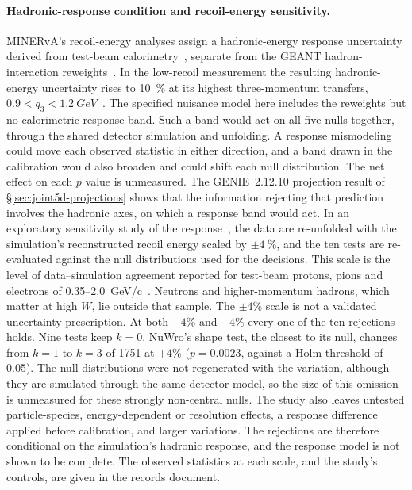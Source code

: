 \paragraph{Hadronic-response condition and recoil-energy sensitivity.} MINERvA's recoil-energy analyses assign a hadronic-energy response uncertainty derived from test-beam calorimetry~\cite{MINERvA:2015testbeam}, separate from the GEANT hadron-interaction reweights~\cite{MINERvA:2021owq,MINERvA:2022incl}. In the low-recoil measurement the resulting hadronic-energy uncertainty rises to \SI{10}{\percent} at its highest three-momentum transfers, $0.9<q_{3}<\SI{1.2}{GeV}$~\cite{MINERvA:2022incl}. The specified nuisance model here includes the reweights but no calorimetric response band. Such a band would act on all five nulls together, through the shared detector simulation and unfolding. A response mismodeling could move each observed statistic in either direction, and a band drawn in the calibration would also broaden and could shift each null distribution. The net effect on each $p$ value is unmeasured. The GENIE~2.12.10 projection result of \S\ref{sec:joint5d-projections} shows that the information rejecting that prediction involves the hadronic axes, on which a response band would act. In an exploratory sensitivity study of the response~\cite{JointTestRecoil2026}, the data are re-unfolded with the simulation's reconstructed recoil energy scaled by $\pm\SI{4}{\percent}$, and the ten tests are re-evaluated against the null distributions used for the decisions. This scale is the level of data--simulation agreement reported for test-beam protons, pions and electrons of 0.35--\SI{2.0}{GeV/c}~\cite{MINERvA:2015testbeam}. Neutrons and higher-momentum hadrons, which matter at high $W$, lie outside that sample. The $\pm4\%$ scale is not a validated uncertainty prescription. At both $-4\%$ and $+4\%$ every one of the ten rejections holds. Nine tests keep $k=0$. NuWro's shape test, the closest to its null, changes from $k=1$ to $k=3$ of 1751 at $+4\%$ ($p=0.0023$, against a Holm threshold of 0.05). The null distributions were not regenerated with the variation, although they are simulated through the same detector model, so the size of this omission is unmeasured for these strongly non-central nulls. The study also leaves untested particle-species, energy-dependent or resolution effects, a response difference applied before calibration, and larger variations. The rejections are therefore conditional on the simulation's hadronic response, and the response model is not shown to be complete. The observed statistics at each scale, and the study's controls, are given in the records document.

